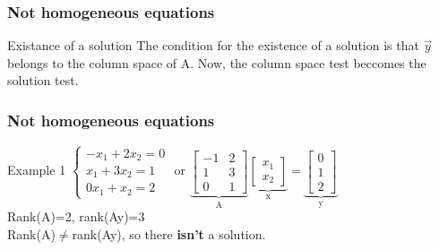 \begin{frame}
	\frametitle{Not homogeneous equations}
	\begin{block}{Existance of a solution}
		The condition for the existence of a solution is that $\overrightarrow{y}$ belongs to the column space of A. Now, the column space test beccomes the solution test.\\
	\end{block}
\end{frame}

\begin{frame}
	\frametitle{Not homogeneous equations}
	\begin{block}{Example 1}
		$\begin{cases}
		-x_1+2x_2=0\\
		x_1+3x_2=1\\
		0x_1+x_2=2
		\end{cases}$ or $\underbrace{\begin{bmatrix}
		-1 & 2 \\
		1 & 3\\
		0 & 1
		\end{bmatrix}}_\text{A} \underbrace{\begin{bmatrix}
		x_1\\
		x_2
		\end{bmatrix}}_\text{x}=\underbrace{\begin{bmatrix}
		0\\1\\2
		\end{bmatrix}}_\text{y}$\\
	Rank(A)=2, rank(Ay)=3 \\
	Rank(A)$\neq$rank(Ay), so there \textbf{isn't} a solution.
	\end{block}
\end{frame}

